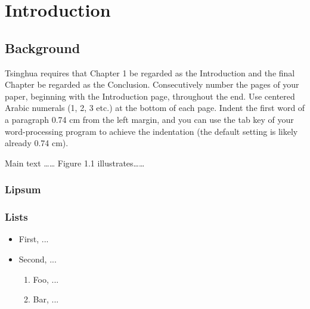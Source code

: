 

\chapter{Introduction}

\section{Background}

Tsinghua requires that Chapter 1 be regarded as the Introduction and the final Chapter be regarded as the Conclusion. Consecutively number the pages of your paper, beginning with the Introduction page, throughout the end. Use centered Arabic numerals (1, 2, 3 etc.) at the bottom of each page. Indent the first word of a paragraph 0.74 cm from the left margin, and you can use the tab key of your word-processing program to achieve the indentation (the default setting is likely already 0.74 cm).

Main text …… Figure 1.1 illustrates……

\subsection{Lipsum}

\lipsum[1]

\subsection{Lists}

\begin{itemize}
    \item First, ...
    \item Second, ...
    \begin{enumerate}
        \item Foo, ...
        \item Bar, ...
    \end{enumerate}
\end{itemize}
